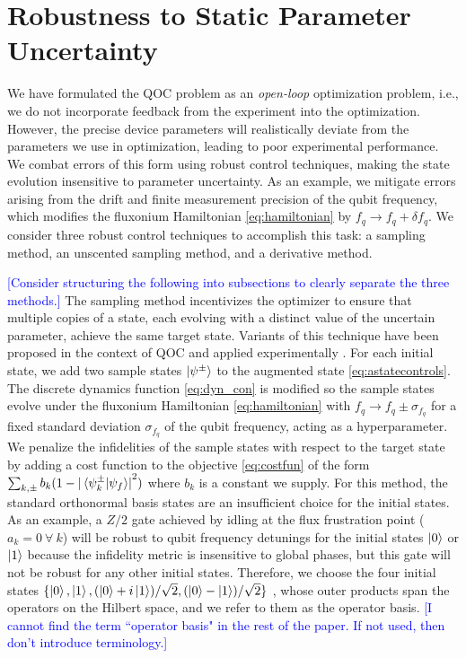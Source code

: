 \section{Robustness to Static Parameter Uncertainty \label{sec:static}}
We have formulated the QOC
problem as an \emph{open-loop} optimization problem, i.e.,
we do not incorporate feedback from the experiment into the optimization.
However, the precise device parameters will realistically deviate from the parameters we use in optimization,
leading to poor experimental performance. We combat errors
of this form using robust control techniques,
making the state evolution insensitive
to parameter uncertainty. As an example,
we mitigate errors arising from the drift and finite measurement
precision of the qubit frequency, which modifies the fluxonium Hamiltonian
\eqref{eq:hamiltonian} by $f_{q} \rightarrow f_{q} + \delta f_{q}$.
We consider three robust control techniques to accomplish this task:
a sampling method, an unscented sampling method,
and a derivative method.

\textcolor{blue}{[Consider structuring the following into subsections to clearly separate the three methods.]}
The sampling method incentivizes the optimizer
to ensure that multiple copies of a state, each evolving
with a distinct value of the uncertain parameter, achieve
the same target state. Variants of this technique have been proposed
in the context of QOC
\cite{allen2019robust, ball2020software, khaneja2005optimal,
  reinhold2019controlling, rembold2020introduction} and applied
experimentally \cite{carvalho2020error}.
For each initial state,
we add two sample states $\ket{\psi^{\pm}}$
to the augmented state \eqref{eq:astatecontrols}. The discrete dynamics
function \eqref{eq:dyn_con} is modified
so the sample states evolve under the fluxonium Hamiltonian \eqref{eq:hamiltonian}
with $f_{q} \rightarrow f_{q} \pm \sigma_{f_{q}}$ for a fixed
 standard deviation $\sigma_{f_{q}}$ of the qubit frequency, acting as a hyperparameter.
We penalize the infidelities of the sample states with respect to the target state
by adding a cost function to the objective \eqref{eq:costfun} of the form
$\sum_{k, \pm} b_{k} (1 - {\lvert \braket*{\psi^{\pm}_{k}}{\psi_{f}} \rvert}^{2})$
where $b_{k}$ is a constant we supply.
For this method, the standard orthonormal basis states are an insufficient choice
for the initial states. As an example, a $Z/2$ gate achieved by idling
at the flux frustration point ($a_{k} = 0 \ \forall \ k$)
will be robust to qubit frequency detunings for the initial states $\ket{0}$
or $\ket{1}$ because the infidelity metric is insensitive to global phases,
but this gate will not be robust for any other initial states.
Therefore, we choose the four initial states $\{\ket{0}, \ket{1}, (\ket{0} + i\ket{1}) / \sqrt{2},
(\ket{0} - \ket{1}) / \sqrt{2}\}$ \cite{chow2009randomized},
whose outer products span the operators on the Hilbert space, and  we refer to them as the operator basis. \textcolor{blue}{[I cannot find the term ``operator basis" in the rest of the paper. If not used, then don't introduce terminology.]}

